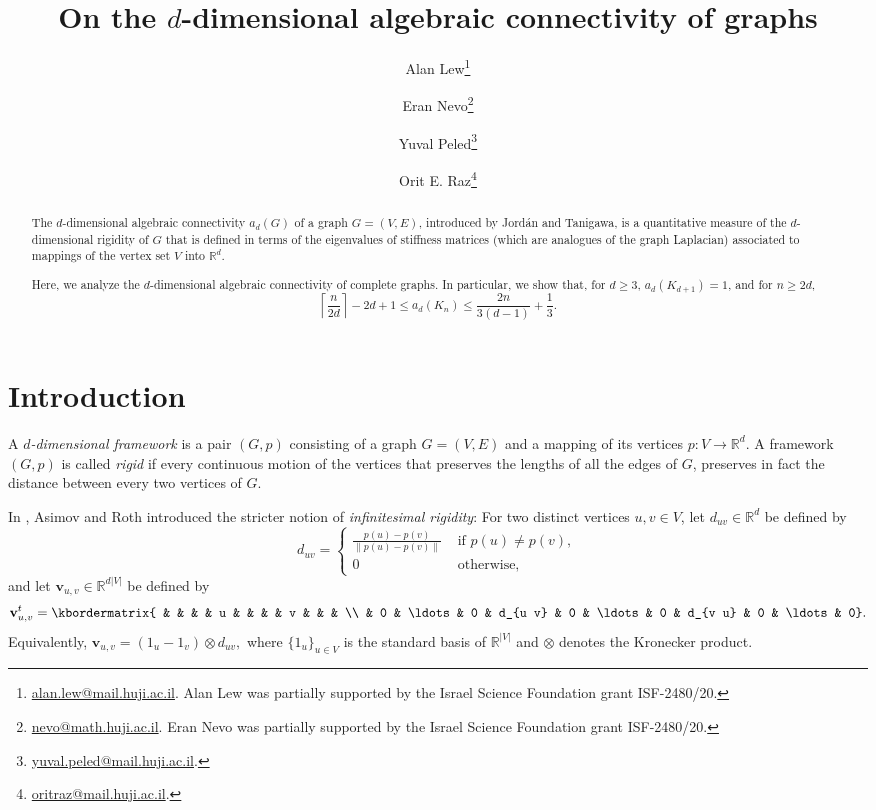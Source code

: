 \documentclass[a4paper,11pt]{article}
\title{On the $d$-dimensional algebraic connectivity of graphs}
\author[1]{Alan Lew\thanks{\href{mailto:alan.lew@mail.huji.ac.il}{alan.lew@mail.huji.ac.il}. Alan Lew was partially supported by the Israel Science Foundation grant ISF-2480/20.}}
\author[1]{Eran Nevo\thanks{\href{mailto:nevo@math.huji.ac.il}{nevo@math.huji.ac.il}. Eran Nevo was partially supported by the Israel Science Foundation grant ISF-2480/20.}}
\author[1]{Yuval Peled\thanks{\href{mailto:yuval.peled@mail.huji.ac.il}{yuval.peled@mail.huji.ac.il}.}}
\author[1]{Orit E. Raz\thanks{\href{mailto:oritraz@mail.huji.ac.il}{oritraz@mail.huji.ac.il}.}}
\affil[1]{Einstein Institute of Mathematics,
 Hebrew University, Jerusalem~91904, Israel}
\date{}
\theoremstyle{plain}
\theoremstyle{definition}
\newcommand{\Rea}{{\mathbb R}}
\newcommand{\bv}{\mathbf v}
\begin{document}
	\maketitle

\begin{abstract}

The $d$-dimensional algebraic connectivity $a_d(G)$ of a graph $G=(V,E)$, introduced by Jord\'an and Tanigawa, is a quantitative measure of the $d$-dimensional rigidity of $G$ that is defined in terms of the eigenvalues of stiffness matrices (which are analogues of the graph Laplacian) associated to mappings of the vertex set $V$ into $\Rea^d$.

Here, we analyze the
$d$-dimensional algebraic connectivity of complete graphs. In particular, we show that, for $d\geq 3$, $a_d(K_{d+1})=1$, and for $n\geq 2d$,
\[
\left\lceil\frac{n}{2d}\right\rceil-2d+1\leq a_d(K_n) \leq \frac{2n}{3(d-1)}+\frac{1}{3}.
\]
\end{abstract}

\section{Introduction}

A \emph{$d$-dimensional framework} is a pair $(G,p)$ consisting of a graph $G=(V,E)$ and a mapping of its vertices $p:V\to \Rea^d$.
A framework $(G,p)$ is called \emph{rigid} if every continuous motion of the vertices that preserves the lengths of all the edges of $G$, preserves in fact the distance between every two vertices of $G$.

In \cite{AR1}, Asimov and Roth introduced the stricter notion of \emph{infinitesimal rigidity}:
For two distinct vertices $u,v\in V$, let $d_{u v}\in \Rea^d$ be defined by
\[
    d_{u v}=\begin{cases}
           \frac{p(u)-p(v)}{\|p(u)-p(v)\|} & \text{ if } p(u)\neq p(v),\\
            0 & \text{ otherwise,}
    \end{cases}
\]
and let $\bv_{u,v}\in \Rea^{d|V|}$ be defined by
\[
   \bv_{u,v} ^t= \kbordermatrix{
     & &  &  & u & & & & v & & & \\
     & 0 & \ldots & 0 & d_{u v} & 0 & \ldots & 0 & d_{v u} & 0 & \ldots & 0}.
\]
Equivalently, $     
\bv_{u,v}= (1_u-1_v)\otimes d_{u v},
$
where $\{1_u\}_{u\in V}$ is the standard basis of $\Rea^{|V|}$ and $\otimes$ denotes the Kronecker product.
\end{document}
